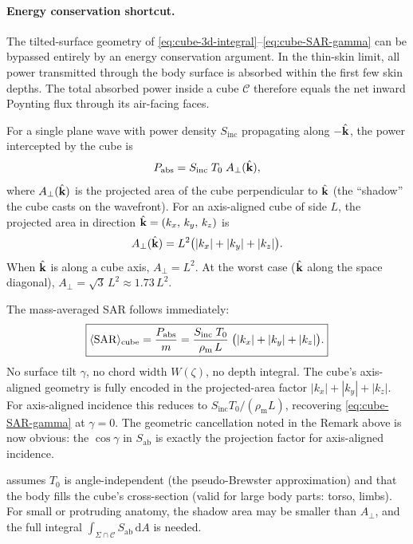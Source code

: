\documentclass[11pt,a4paper]{article}
\theoremstyle{definition}
\theoremstyle{remark}
\newcommand{\Sab}{S_{\mathrm{ab}}}
\newcommand{\Sinc}{S_{\mathrm{inc}}}
\newcommand{\Tzero}{T_0}
\newcommand{\khat}{\hat{\vb{k}}}
\newcommand{\SAR}{\ensuremath{\mathrm{SAR}}}
\newcommand{\rhom}{\rho_{\mathrm{m}}}
\begin{document}
\paragraph{Energy conservation shortcut.}
The tilted-surface geometry of \cref{eq:cube-3d-integral}--\cref{eq:cube-SAR-gamma}
can be bypassed entirely by an energy conservation argument.  In the
thin-skin limit, all power transmitted through the body surface is absorbed
within the first few skin depths.  The total absorbed power inside a cube
$\mathcal{C}$ therefore equals the net inward Poynting flux through its
air-facing faces.

For a single plane wave with power density $\Sinc$ propagating along
$-\khat$, the power intercepted by the cube is
\begin{equation}\label{eq:Pabs-cube}
  P_{\mathrm{abs}} = \Sinc\;\Tzero\;A_\perp(\khat),
\end{equation}
where $A_\perp(\khat)$ is the projected area of the cube perpendicular to
$\khat$ (the ``shadow'' the cube casts on the wavefront).  For an axis-aligned
cube of side $L$, the projected area in direction
$\khat = (k_x,\,k_y,\,k_z)$ is
\begin{equation}\label{eq:Aproj}
  A_\perp(\khat) = L^2\bigl(|k_x| + |k_y| + |k_z|\bigr).
\end{equation}
When $\khat$ is along a cube axis, $A_\perp = L^2$.  At the worst case
($\khat$ along the space diagonal), $A_\perp = \sqrt{3}\,L^2 \approx 1.73\,L^2$.

The mass-averaged SAR follows immediately:
\begin{equation}\label{eq:SAR-energy}
  \boxed{%
  \langle\SAR\rangle_{\mathrm{cube}}
  = \frac{P_{\mathrm{abs}}}{m}
  = \frac{\Sinc\;\Tzero}{\rhom\,L}\;
    \bigl(|k_x| + |k_y| + |k_z|\bigr).
  }
\end{equation}
No surface tilt $\gamma$, no chord width $W(\zeta)$, no depth integral.  The
cube's axis-aligned geometry is fully encoded in the projected-area factor
$|k_x| + |k_y| + |k_z|$.  For axis-aligned incidence this reduces to
$\Sinc\Tzero/(\rhom L)$, recovering \cref{eq:cube-SAR-gamma} at $\gamma = 0$.
The geometric cancellation noted in the Remark above is now obvious: the
$\cos\gamma$ in $\Sab$ is exactly the projection factor for axis-aligned
incidence.

 assumes $\Tzero$ is angle-independent (the
pseudo-Brewster approximation) and that the body fills the cube's cross-section
(valid for large body parts: torso, limbs).  For small or protruding anatomy,
the shadow area may be smaller than $A_\perp$, and the full integral
$\int_{\Sigma \cap \mathcal{C}} \Sab\,\mathrm{d}A$ is needed.
\end{document}
